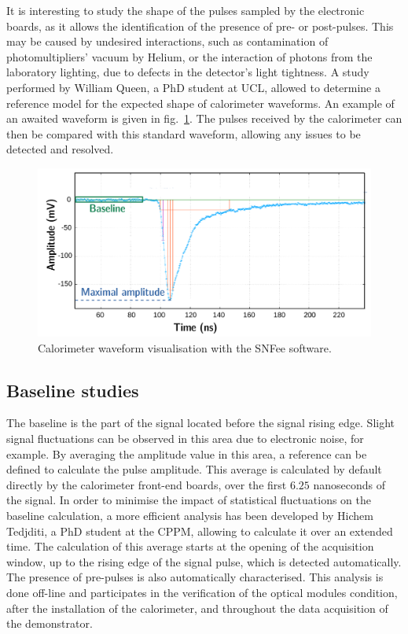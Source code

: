 It is interesting to study the shape of the pulses sampled by the electronic boards, as it allows the identification of the presence of pre- or post-pulses.
This may be caused by undesired interactions, such as contamination of photomultipliers' vacuum by Helium, or the interaction of photons from the laboratory lighting, due to defects in the detector's light tightness.
A study performed by William Queen, a PhD student at UCL, allowed to determine a reference model for the expected shape of calorimeter waveforms.
An example of an awaited waveform is given in fig.~\ref{fig:waveform}.
The pulses received by the calorimeter can then be compared with this standard waveform, allowing any issues to be detected and resolved.
\begin{figure}[h!]
  \centering
  \includegraphics[width=1\textwidth]{commissioning/fig_commissioning/waveform.pdf}
  \caption{Calorimeter waveform visualisation with the SNFee software.
    \label{fig:waveform}}
\end{figure}



\subsection{Baseline studies}

The baseline is the part of the signal located before the signal rising edge.
Slight signal fluctuations can be observed in this area due to electronic noise, for example.
By averaging the amplitude value in this area, a reference can be defined to calculate the pulse amplitude.
This average is calculated by default directly by the calorimeter front-end boards, over the first $6.25$ nanoseconds of the signal.
In order to minimise the impact of statistical fluctuations on the baseline calculation, a more efficient analysis has been developed by Hichem Tedjditi, a PhD student at the CPPM, allowing to calculate it over an extended time.
The calculation of this average starts at the opening of the acquisition window, up to the rising edge of the signal pulse, which is detected automatically.
The presence of pre-pulses is also automatically characterised.
This analysis is done off-line and participates in the verification of the optical modules condition, after the installation of the calorimeter, and throughout the data acquisition of the demonstrator.

